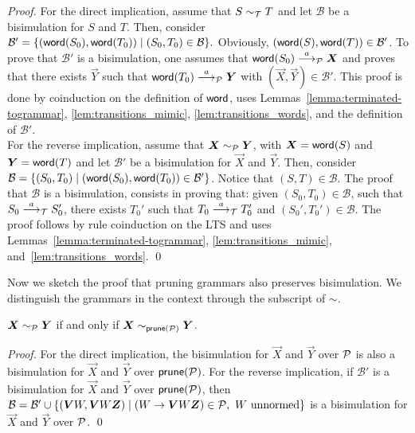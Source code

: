 \begin{proof}
For the direct implication, assume that $S \sim_\mathcal T T$ and let
$\mathcal{B}$ be a bisimulation for $S$ and $T$. Then, consider 
$ \mathcal{B}' = 
\{(\mathsf{word} (S_0), \mathsf{word}(T_0))\mid (S_0,T_0)\in \mathcal{B} \}. $
Obviously, $(\mathsf{word}(S), \mathsf{word}(T))\in \mathcal{B}'$. To prove that
$\mathcal{B}'$ is a bisimulation, one assumes that 
$\word (S_0)\LTSderivesP \vec X $ and proves that there exists
$\vec Y$ such that $\word (T_0)\LTSderivesP \vec Y $
with $(\vec X, \vec Y)\in \mathcal{B}'$. This proof  
is done by coinduction on the definition of $\mathsf{word}$, uses 
Lemmas~\ref{lemma:terminated-togrammar},
\ref{lem:transitions_mimic}, \ref{lem:transitions_words},
and the definition of $\mathcal{B}'$. \smallskip\\
For the reverse implication, assume that 
$\vec X \ProdEquiv \vec Y$, with $\vec X = \word (S)$ and
$\vec Y = \word(T)$ and let $\mathcal{B}'$ be a bisimulation
for $\vec X$ and $\vec Y$. Then, consider
$\mathcal{B} = \{(S_0, T_0)\mid (\mathsf{word}(S_0),\mathsf{word}(T_0))\in \mathcal{B}'\}$.
Notice that $(S,T)\in \mathcal{B}$.
The proof that $\mathcal{B}$ is a bisimulation, consists in proving that:
given $(S_0, T_0)\in \mathcal{B}$, such that $S_0\stackrel{a}{\longrightarrow}_\mathcal T S_0'$,
there exists $T_0'$ such that $T_0\stackrel{a}{\longrightarrow}_\mathcal T T_0'$
and $(S_0',T_0')\in \mathcal{B}$. The proof
follows by rule coinduction on the LTS and uses 
Lemmas~\ref{lemma:terminated-togrammar},
\ref{lem:transitions_mimic}, and~\ref{lem:transitions_words}. \qed 
\end{proof}

Now we sketch the proof that pruning grammars also preserves bisimulation.
We distinguish the grammars in the context through the subscript of $\sim$.

\begin{theorem}
	\label{thm:pruning_preserves_bisim}
	$\vec X \bisimP \vec Y$ if and only if $\vec X \sim_{\Prune(\productions)} \vec Y$.
\end{theorem}

\begin{proof}
For the direct implication, the bisimulation for $\vec X$ and $\vec Y$ over
$\mathcal P$ is also a bisimulation for $\vec X$ and $\vec Y$ over
$\mathsf{prune}(\mathcal P)$. For the reverse implication, if $\mathcal{B}'$
is a bisimulation for $\vec X$ and $\vec Y$ over $\mathsf{prune}(\mathcal P)$,
then $\mathcal{B} = \mathcal{B}' \cup 
\{(\vec V W, \vec V W \vec Z) \mid  (W\rightarrow \vec V W \vec Z) \in \productions, 
\text{ $W$ unnormed} \}$ 
is a bisimulation for $\vec X$ and $\vec Y$ over $\mathcal P$. \qed
\end{proof}


